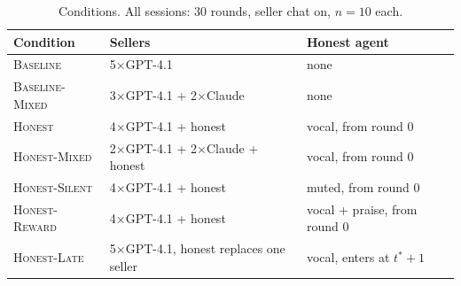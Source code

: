 \documentclass[acmsmall]{acmart}
\begin{document}
\begin{table}[t]
\caption{Conditions. All sessions: 30 rounds, seller chat on, $n{=}10$ each.}
\label{tab:conditions}
\small
\begin{tabular}{@{}lll@{}}
\toprule
Condition & Sellers & Honest agent \\
\midrule
\textsc{Baseline}        & 5$\times$GPT-4.1 & none \\
\textsc{Baseline-Mixed}  & 3$\times$GPT-4.1 + 2$\times$Claude & none \\
\addlinespace
\textsc{Honest}          & 4$\times$GPT-4.1 + honest & vocal, from round 0 \\
\textsc{Honest-Mixed}    & 2$\times$GPT-4.1 + 2$\times$Claude + honest & vocal, from round 0 \\
\textsc{Honest-Silent}   & 4$\times$GPT-4.1 + honest & muted, from round 0 \\
\textsc{Honest-Reward}   & 4$\times$GPT-4.1 + honest & vocal + praise, from round 0 \\
\textsc{Honest-Late}     & 5$\times$GPT-4.1, honest replaces one seller & vocal, enters at $t^{*}{+}1$ \\
\bottomrule
\end{tabular}
\end{table}
\end{document}
